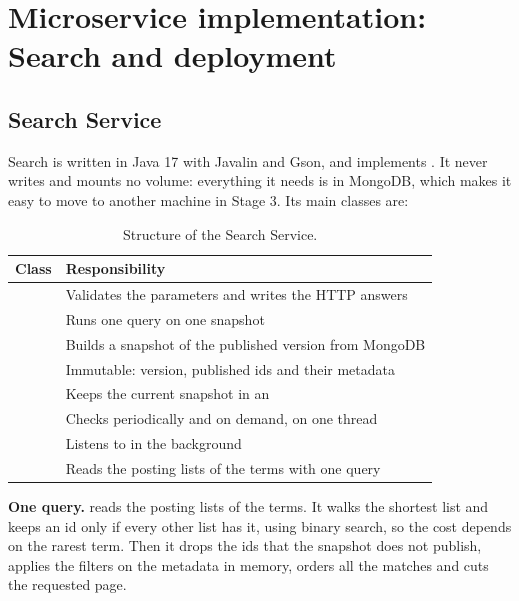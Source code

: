 \section{Microservice implementation: Search and deployment}
\label{sec:search}

\subsection{Search Service}

Search is written in Java 17 with Javalin and Gson, and implements . It never writes and
mounts no volume: everything it needs is in MongoDB, which makes it easy to move to another machine in Stage 3.
Its main classes are:

\begin{table}[H]
\centering\small
\begin{tabularx}{\linewidth}{@{}L{4.3cm}X@{}}
\toprule
\textbf{Class} & \textbf{Responsibility} \\
\midrule
{} & Validates the parameters and writes the HTTP answers \\
 & Runs one query on one snapshot \\
 & Builds a snapshot of the published version from MongoDB \\
 & Immutable: version, published ids and their metadata \\
 & Keeps the current snapshot in an  \\
 & Checks  periodically and on demand, on one thread \\
 & Listens to  in the background \\
 & Reads the posting lists of the terms with one query \\
\bottomrule
\end{tabularx}
\caption{Structure of the Search Service.}
\end{table}

\textbf{One query.}  reads the posting lists of the terms. It walks the shortest list and
keeps an id only if every other list has it, using binary search, so the cost depends on the rarest term. Then
it drops the ids that the snapshot does not publish, applies the filters on the metadata in memory, orders all
the matches and cuts the requested page.

